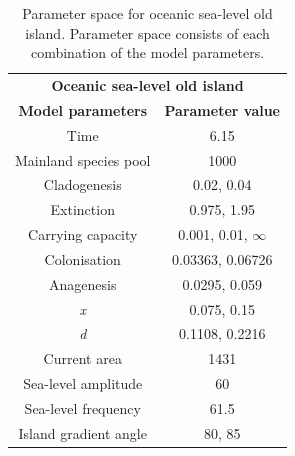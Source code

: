 \begin{table}[ht]
    \centering
    \caption{Parameter space for oceanic sea-level old island. Parameter space consists of each combination of the model parameters.}
    \begin{tabular}{ c | c }
        \multicolumn{2}{c}{\textbf{Oceanic sea-level old island}} \\
        \textbf{Model parameters} & \textbf{Parameter value} \\ 
        \hline
        \hline
        Time & 6.15 \\
        \hline
        Mainland species pool & 1000 \\
        \hline
        Cladogenesis & 0.02, 0.04 \\
        \hline
        Extinction & 0.975, 1.95 \\
        \hline
        Carrying capacity & 0.001, 0.01, $\infty$ \\
        \hline
        Colonisation & 0.03363, 0.06726 \\
        \hline
        Anagenesis & 0.0295, 0.059 \\
        \hline
        \textit{x} & 0.075, 0.15 \\
        \hline
        \textit{d} & 0.1108, 0.2216 \\
        \hline
        Current area & 1431 \\
        \hline
        Sea-level amplitude & 60 \\
        \hline
        Sea-level frequency & 61.5 \\
        \hline
        Island gradient angle & 80, 85 \\
    \end{tabular}
    \label{tab:oceanic_sea_level_old}
\end{table}

